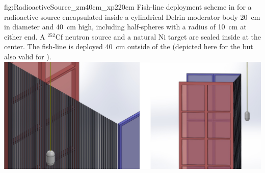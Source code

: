 \begin{dunefigure}
{fig:RadioactiveSource_zm40cm_xp220cm}
{Fish-line deployment scheme in  for a radioactive source encapsulated inside a cylindrical Delrin moderator body \SI{20}{\cm} in diameter and \SI{40}{\cm} high, including half-spheres with a radius of \SI{10}{\cm} at either end. A $^{252}$Cf neutron source and a natural Ni target are sealed inside at the center. The fish-line is deployed \SI{40}{\cm} outside of the   (depicted here for the  but also valid for ).
}
\includegraphics[width=1.0\linewidth]{graphics/RadioactiveSource_zm40cm_xp220cm.jpg}
\end{dunefigure}




